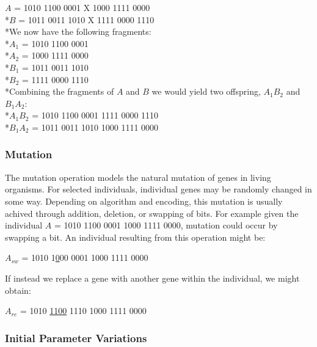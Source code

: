 \begin{center}
$A$ = 1010 1100 0001 X 1000 1111 0000
\\*$B$ = 1011 0011 1010 X 1111 0000 1110
\vspace{2 mm}
\\*We now have the following fragments: 
\\*$A_{1}$ = 1010 1100 0001 
\\*$A_{2}$ = 1000 1111 0000
\\*$B_{1}$ = 1011 0011 1010 
\\*$B_{2}$ = 1111 0000 1110
\vspace{2 mm}
\\*Combining the fragments of $A$ and $B$ we would yield two offspring, $A_{1}B_{2}$ and $B_{1}A_{2}$:
\vspace{2 mm}
\\*$A_{1}B_{2}$ = 1010 1100 0001 1111 0000 1110
\\*$B_{1}A_{2}$ = 1011 0011 1010 1000 1111 0000
\end{center}

\subsubsection{Mutation}
The mutation operation models the natural mutation of genes in living organisms. For selected individuals, individual genes may be randomly 
changed in some way. Depending on algorithm and encoding, this mutation is usually achived through addition, deletion, or swapping of bits.
For example given the individual $A$ = 1010 1100 0001 1000 1111 0000, mutation could occur by swapping a bit. An individual resulting from this operation might be: 
\begin{center} $A_{sw}$ = 1010 1\underline{0}00 0001 1000 1111 0000 \end{center}
If instead we replace a gene with another gene within the individual, we might obtain:
\begin{center} $A_{re}$ =   1010 \underline{1100} 1110 1000 1111 0000 \end{center}
                                                           
\subsubsection{Initial Parameter Variations}

